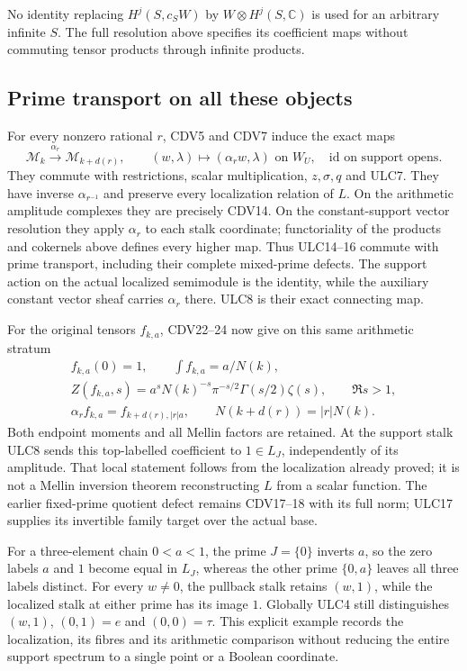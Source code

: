 No identity replacing $H^j(S,c_SW)$ by
$W\otimes H^j(S,\mathbb C)$ is used for an arbitrary infinite
$S$. The full resolution above specifies its coefficient maps
without commuting tensor products through infinite products.

\subsection{Prime transport on all these objects}
For every nonzero rational $r$, CDV5 and CDV7 induce the exact maps
\begin{equation}\tag{ULC17}
 \mathcal M_k\xrightarrow{\alpha_r}\mathcal M_{k+d(r)},\qquad
 (w,\lambda)\mapsto(\alpha_rw,\lambda)\text{ on }W_U,
 \quad\mathrm{id}\text{ on support opens}.
\end{equation}
They commute with restrictions, scalar multiplication, $z,\sigma,q$
and ULC7. They have inverse $\alpha_{r^{-1}}$ and preserve every
localization relation of $L$. On the arithmetic amplitude complexes
they are precisely CDV14. On the constant-support vector resolution
they apply $\alpha_r$ to each stalk coordinate; functoriality of
the products and cokernels above defines every higher map. Thus
ULC14--16 commute with prime transport, including their complete
mixed-prime defects. The support action on the actual localized
semimodule is the identity, while the auxiliary constant vector
sheaf carries $\alpha_r$ there. ULC8 is their exact connecting map.

For the original tensors $f_{k,a}$, CDV22--24 now give on this
same arithmetic stratum
\begin{equation}\tag{ULC18}
 \begin{gathered}
 f_{k,a}(0)=1,\qquad\int f_{k,a}=a/N(k),\\
 Z(f_{k,a},s)=a^sN(k)^{-s}\pi^{-s/2}\Gamma(s/2)\zeta(s),
 \qquad\Re s>1,\\
 \alpha_rf_{k,a}=f_{k+d(r),|r|a},\qquad
 N(k+d(r))=|r|N(k).
 \end{gathered}
\end{equation}
Both endpoint moments and all Mellin factors are retained. At the
support stalk ULC8 sends this top-labelled coefficient to $1\in L_J$,
independently of its amplitude. That local statement follows from
the localization already proved; it is not a Mellin inversion
theorem reconstructing $L$ from a scalar function. The earlier
fixed-prime quotient defect remains CDV17--18 with its full norm;
ULC17 supplies its invertible family target over the actual base.

For a three-element chain $0<a<1$, the prime $J=\{0\}$ inverts
$a$, so the zero labels $a$ and $1$ become equal in $L_J$, whereas
the other prime $\{0,a\}$ leaves all three labels distinct.
For every $w\ne0$, the pullback stalk retains $(w,1)$, while the
localized stalk at either prime has its image $1$. Globally ULC4
still distinguishes $(w,1)$, $(0,1)=e$ and $(0,0)=\tau$.
This explicit example records the localization, its fibres and its
arithmetic comparison without reducing the entire support spectrum
to a single point or a Boolean coordinate.
